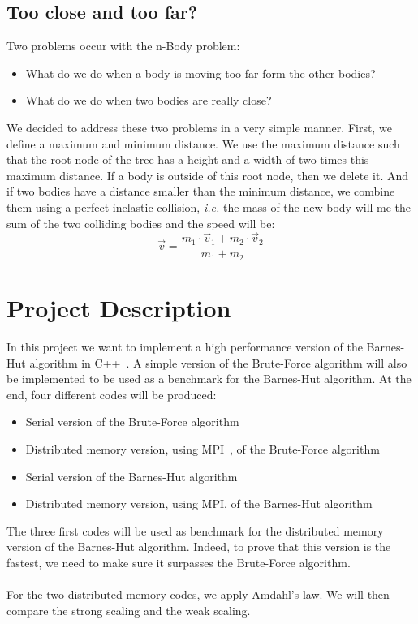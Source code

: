 \documentclass[10pt,a4paper]{article}
\begin{document}
\subsection{Too close and too far?} 
Two problems occur with the n-Body problem:
\begin{itemize}
\item What do we do when a body is moving too far form the other bodies?
\item What do we do when two bodies are really close? 
\end{itemize} 

We decided to address these two problems in a very simple manner. First, we define a maximum and minimum distance. We use the maximum distance such that the root node of the tree has a height and a width of two times this maximum distance. If a body is outside of this root node, then we delete it. And if two bodies have a distance smaller than the minimum distance, we combine them using a perfect inelastic collision, {\it i.e.} the mass of the new body will me the sum of the two colliding bodies and the speed will be:
\[
\vec{v} = \frac{m_1\cdot\vec{v}_1 + m_2\cdot\vec{v}_2}{m_1+m_2}
\]

\section{Project Description}

In this project we want to implement a high performance version of the Barnes-Hut algorithm in C++~\cite{c++}. A simple version of the Brute-Force algorithm will also be implemented to be used as a benchmark for the Barnes-Hut algorithm. At the end, four different codes will be produced:
\begin{itemize}
\item Serial version of the Brute-Force algorithm
\item Distributed memory version, using MPI~\cite{mpi}, of the Brute-Force algorithm
\item Serial version of the Barnes-Hut algorithm
\item Distributed memory version, using MPI, of the Barnes-Hut algorithm
\end{itemize}
The three first codes will be used as benchmark for the distributed memory version of the Barnes-Hut algorithm. Indeed, to prove that this version is the fastest, we need to make sure it surpasses the Brute-Force algorithm. 
\\\\
For the two distributed memory codes, we apply Amdahl's law. We will then compare the strong scaling and the weak scaling.
\end{document}
